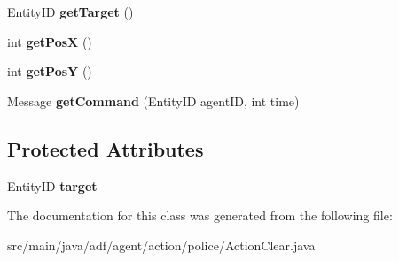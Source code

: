 \begin{DoxyCompactItemize}
Entity\+ID {\bfseries get\+Target} ()
\item 
\hypertarget{classadf_1_1agent_1_1action_1_1police_1_1ActionClear_a21e54fc3a4289d546398f8f623ffe52e}{}\label{classadf_1_1agent_1_1action_1_1police_1_1ActionClear_a21e54fc3a4289d546398f8f623ffe52e} 
int {\bfseries get\+PosX} ()
\item 
\hypertarget{classadf_1_1agent_1_1action_1_1police_1_1ActionClear_a0b81ff28273e1c267147e58cf4bf6595}{}\label{classadf_1_1agent_1_1action_1_1police_1_1ActionClear_a0b81ff28273e1c267147e58cf4bf6595} 
int {\bfseries get\+PosY} ()
\item 
\hypertarget{classadf_1_1agent_1_1action_1_1police_1_1ActionClear_add96a279d2f46903fb7419be6ff21cca}{}\label{classadf_1_1agent_1_1action_1_1police_1_1ActionClear_add96a279d2f46903fb7419be6ff21cca} 
Message {\bfseries get\+Command} (Entity\+ID agent\+ID, int time)
\end{DoxyCompactItemize}
\subsection*{Protected Attributes}
\begin{DoxyCompactItemize}
\item 
\hypertarget{classadf_1_1agent_1_1action_1_1police_1_1ActionClear_a5623b17139cc8f34bbd1f22f22bf836d}{}\label{classadf_1_1agent_1_1action_1_1police_1_1ActionClear_a5623b17139cc8f34bbd1f22f22bf836d} 
Entity\+ID {\bfseries target}
\end{DoxyCompactItemize}


The documentation for this class was generated from the following file\+:\begin{DoxyCompactItemize}
\item 
src/main/java/adf/agent/action/police/Action\+Clear.\+java\end{DoxyCompactItemize}
